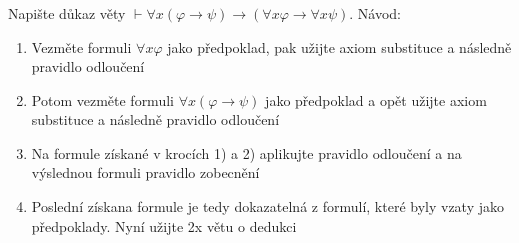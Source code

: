 \subsubsection{}
Napište důkaz věty $\vdash \forall x (\varphi \rightarrow \psi) \rightarrow
(\forall x \varphi \rightarrow \forall x \psi)$. Návod:

\begin{enumerate}
  \item Vezměte formuli $\forall x \varphi$ jako předpoklad, pak užijte axiom substituce a
následně pravidlo odloučení
  \item Potom vezměte formuli $\forall x (\varphi \rightarrow \psi)$ jako předpoklad a opět užijte axiom
substituce a následně pravidlo odloučení
  \item Na formule získané v krocích 1) a 2) aplikujte pravidlo odloučení a na
výslednou formuli pravidlo zobecnění
  \item Poslední získana formule je tedy dokazatelná z formulí, které byly vzaty
jako předpoklady. Nyní užijte 2x větu o dedukci
\end{enumerate}
